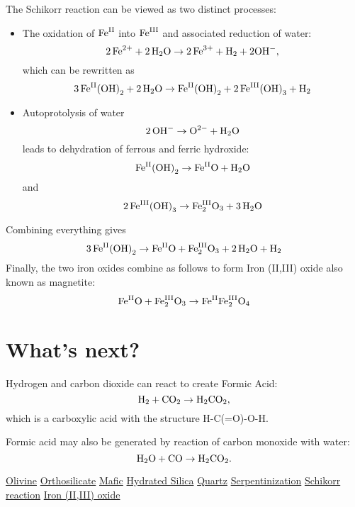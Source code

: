 \documentclass[a4paper,14pt]{extarticle}
\def\H{{\rm H}}
\def\O{{\rm O}}
\def\C{{\rm C}}
\def\Fe{{\rm Fe}}
\def\II{{\rm II}}
\def\III{{\rm III}}
\begin{document}
The Schikorr reaction can be viewed as two distinct processes:

\begin{itemize}
    \item
The oxidation of $\Fe^{\II}$ into $\Fe^{\III}$ and associated reduction of water:
\[
    2\, \Fe^{2+} + 2\, \H_2\O \rightarrow 2\, \Fe^{3+} + \H_2 + 2\O\H^-,
\]
which can be rewritten as
\[
    3\, \Fe^{\II}{(\O\H)}_2 + 2\, \H_2\O \rightarrow \Fe^{\II}{(\O\H)}_2 + 2\, \Fe^{\III}{(\O\H)}_3 + \H_2
\]

    \item
        Autoprotolysis of water
\[
    2\, \O\H^- \rightarrow \O^{2-} + \H_2\O
\]
leads to dehydration of ferrous and ferric hydroxide:
\[
    \Fe^{\II}{(\O\H)}_2 \rightarrow \Fe^{\II}\O + \H_2\O
\]
and
\[
    2\,\Fe^{\III}{(\O\H)}_3 \rightarrow \Fe^{\III}_2\O_3 + 3\,\H_2\O
\]
\end{itemize}
Combining everything gives
\[
    3\, \Fe^{\II}{(\O\H)}_2 \rightarrow \Fe^{\II}\O + \Fe^{\III}_2\O_3 + 2\,\H_2\O + \H_2
\]
Finally, the two iron oxides combine as follows to form Iron (II,III) oxide\cite{iron_ii_iii_oxide} also known as
magnetite:
\[
    \Fe^{\II}\O + \Fe_2^{\III}\O_3 \rightarrow \Fe^{\II}\Fe^{\III}_2\O_4
\]



\section{What's next?}
Hydrogen and carbon dioxide can react to create Formic Acid:
\[
    \H_2 + \C\O_2 \rightarrow \H_2\C\O_2,
\]
which is a carboxylic acid with the structure H-C(=O)-O-H.

Formic acid may also be generated by reaction of carbon monoxide with water:
\[
    \H_2\O + \C\O \rightarrow \H_2\C\O_2.
\]



\begin{thebibliography}{9}
               \href{https://en.wikipedia.org/wiki/Olivine}{Olivine}
         \href{https://en.wikipedia.org/wiki/Orthosilicate}{Orthosilicate}
                 \href{https://en.wikipedia.org/wiki/Mafic}{Mafic}
       \href{https://en.wikipedia.org/wiki/Hydrated_silica}{Hydrated Silica}
                \href{https://en.wikipedia.org/wiki/Quartz}{Quartz}
      \href{https://en.wikipedia.org/wiki/Serpentinization}{Serpentinization}
     \href{https://en.wikipedia.org/wiki/Schikorr_reaction}{Schikorr reaction}
     \href{https://en.wikipedia.org/wiki/Iron(II,III)_oxide}{Iron (II,III) oxide}
\end{thebibliography}
\end{document}
